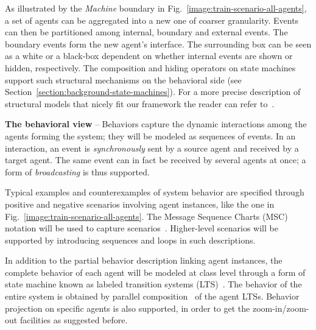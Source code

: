 As illustrated by the \emph{Machine} boundary in Fig.~\ref{image:train-scenario-all-agents}, a set of agents can be aggregated into a new one of coarser granularity. Events can then be partitioned among internal, boundary and external events. The boundary events form the new agent's interface. The surrounding box can be seen as a white or a black-box dependent on whether internal events are shown or hidden, respectively. The composition and hiding operators on state machines support such structural mechanisms on the behavioral side (see Section~\ref{section:background-state-machines}). For a more precise description of structural models that nicely fit our framework the reader can refer to~\cite{Magee:1995}.


\noindent \textbf{The behavioral view} -- Behaviors capture the dynamic interactions among the agents forming the system; they will be modeled as sequences of events. In an interaction, an event is \emph{synchronously} sent by a source agent and received by a target agent. The same event can in fact be received by several agents at once; a form of \emph{broadcasting} is thus supported. 

Typical examples and counterexamples of system behavior are specified through positive and negative scenarios involving agent instances, like the one in Fig.~\ref{image:train-scenario-all-agents}. The Message Sequence Charts (MSC) notation will be used to capture scenarios~\cite{ITU:1996}. Higher-level scenarios will be supported by introducing sequences and loops in such descriptions.

In addition to the partial behavior description linking agent instances, the complete behavior of each agent will be modeled at class level through a form of state machine known as labeled transition systems (LTS)~\cite{Keller:1976, Milner:1989}. The behavior of the entire system is obtained by parallel composition~\cite{Hoare:1985} of the agent LTSs. Behavior  projection on specific agents is also supported, in order to get the zoom-in/zoom-out facilities as suggested before.

